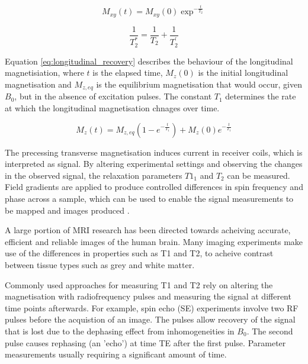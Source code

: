 \documentclass[3p, twocolumn]{elsarticle}
\begin{document}
\begin{equation} \label{eq:transverse_decay}
M_{xy} (t) = M_{xy}(0)\exp^{-\frac{t}{T_{2}}}
\end{equation}

\begin{equation} \label{eq:T2star}
 \frac{1}{T^{*}_{2}} = \frac{1}{T_{2}} + \frac{1}{T^{'}_2}
\end{equation}

Equation \eqref{eq:longitudinal_recovery} describes the behaviour of the longitudinal magnetisiation, where $ t $ is the elapsed time, $M_{z}(0)$ is the initial longitudinal magnetisation and $M_{z,eq}$ is the equilibrium magnetisation that would occur, given $B_0$, but in the absence of excitation pulses. The constant $T_1$ determines the rate at which the longitudinal magnetisation chnages over time.

\begin{equation} \label{eq:longitudinal_recovery}
M_{z} (t) = M_{z,eq}(1 - e^{-\frac{t}{T_1}} ) + M_{z}(0)e^{-\frac{t}{T_1} } 
\end{equation}

The precessing transverse magnetisation induces current in receiver coils, which is interpreted as signal. By altering experimental settings and observing the changes in the observed signal, the relaxation parameters $T1_1$ and $T_2$ can be measured. Field gradients are applied to produce controlled differences in spin frequency and phase across a sample, which can be used to enable the signal measurements to be mapped and images produced  \cite{haackemagnetic}.

A large portion of MRI research has been directed towards acheiving accurate, efficient and reliable images of the human brain.  Many imaging experiments make use of the differences in properties such as T1 and T2, to acheive contrast between tissue types such as grey and white matter.

Commonly used approaches for measuring T1 and T2 rely on altering the magnetisation with radiofrequency pulses and measuring the signal at different time points afterwards. For example, spin echo (SE) experiments involve two RF pulses before the acquistion of an image. The pulses allow recovery of the signal that is lost due to the dephasing effect from inhomogeneities in $B_0$. The second pulse causes rephasing (an 'echo') at time TE after the first pulse. Parameter measurements usually requiring a significant amount of time.   %
\end{document}
